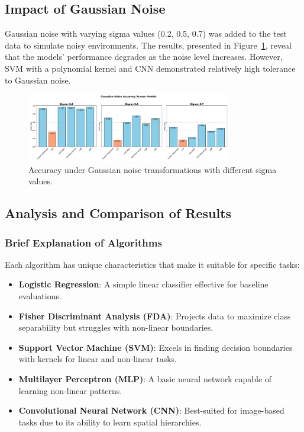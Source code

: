 \documentclass{article}
\begin{document}
\subsection{Impact of Gaussian Noise}
Gaussian noise with varying sigma values (0.2, 0.5, 0.7) was added to the test data to simulate noisy environments. The results, presented in Figure~\ref{fig:gaussian_noise_accuracy}, reveal that the models' performance degrades as the noise level increases. However, SVM with a polynomial kernel and CNN demonstrated relatively high tolerance to Gaussian noise.

\begin{figure}[h!]
    \centering
    \includegraphics[width=0.8\textwidth]{images/gaussian_noise.pdf}
    \caption{Accuracy under Gaussian noise transformations with different sigma values.}
    \label{fig:gaussian_noise_accuracy}
\end{figure}

\subsection{Analysis and Comparison of Results}

\subsubsection{Brief Explanation of Algorithms}
Each algorithm has unique characteristics that make it suitable for specific tasks:
\begin{itemize}
    \item \textbf{Logistic Regression}: A simple linear classifier effective for baseline evaluations.
    \item \textbf{Fisher Discriminant Analysis (FDA)}: Projects data to maximize class separability but struggles with non-linear boundaries.
    \item \textbf{Support Vector Machine (SVM)}: Excels in finding decision boundaries with kernels for linear and non-linear tasks.
    \item \textbf{Multilayer Perceptron (MLP)}: A basic neural network capable of learning non-linear patterns.
    \item \textbf{Convolutional Neural Network (CNN)}: Best-suited for image-based tasks due to its ability to learn spatial hierarchies.
\end{itemize}
\end{document}
